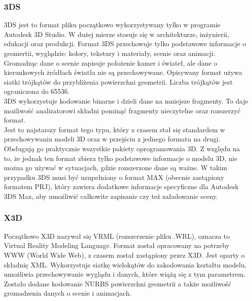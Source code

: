\subsubsection{3DS}
3DS jest to format pliku początkowo wykorzystywany tylko w programie Autodesk 3D Studio. W dużej mierze stosuje się w architekturze, inżynierii, edukacji oraz produkcji. 
Format 3DS przechowuje tylko podstawowe informacje o geomertii, wyglądzie: kolory, tekstury i materiały, scenie oraz animacji. Gromadząc dane o scenie zapisuje położenie kamer i świateł, ale dane o kierunkowych żródłach światła nie są przechowywane. Opisywany format używa siatki trójkątów do przybliżenia powierzchni geometrii. Liczba trójkątów jest ograniczona do 65536. \\
3DS wykorzystuje kodowanie binarne i dzieli dane na mniejsze fragmenty. To daje możliwość analizatorowi składni pominąć fragmenty nieczytelne oraz rozszerzyć format.\\
Jest to najstarszy format tego typu, który z czasem stał się standardem w przechowywaniu modeli 3D oraz w przejściu z jednego formatu na drugi.
Obsługują go praktycznie wszystkie pakiety oprogramowania 3D. Z względu na to, że jednak ten format zbiera tylko podstawowe informacje o modelu 3D, nie można go używać w sytuacjach, gdzie rozszerzone dane są ważne. W takim przypadku 3DS musi być uzupełniony o format MAX (obecnie zastąpiony formatem PRJ), który zawiera dodatkowe informacje specyficzne dla Autodesk 3DS Max, aby umożliwić całkowite zapisanie czy też załadowanie sceny.

\subsubsection{X3D}
Początkowo X3D nazywał się VRML (rozszerzenie pliku .WRL), oznacza to Virtual Reality Modeling Language. Format został opracowany na potrzeby WWW (World Wide Web), z czasem został zastąpiony przez X3D. Jest oparty o składnię XML. Wykorzystuje siatkę wielokątów do zakodowania kształtu modelu, umożliwia przechowywanie wyglądu i danych, które wiążą się z tym parametrem. Zostało dodane kodowanie NURBS powierzchni geometrii a także możliwość gromadzenia danych o scenie i animacjach.

